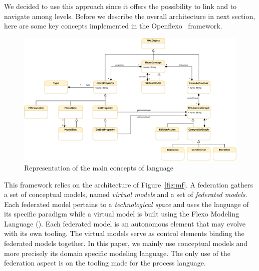 We decided to use this approach since it offers the possibility to
link and to navigate among levels. Before we describe the overall
architecture in next section, here are some key concepts implemented
in the Openflexo~\parencite{openflexo_link} framework.



\begin{figure}
    \centering
    \includegraphics[width=1.0 \textwidth]{Figures/FMLMetaModel.pdf}
    \caption{Representation of the main concepts of \FML language}
    \label{fig:mm}
\end{figure}

This framework relies on the architecture of Figure~\ref{fig:mf}. A federation
gathers a set of conceptual models, named \emph{virtual models} and a
set of \emph{federated models}. Each federated model pertains to a
\emph{technological space} and uses the language of its specific
paradigm while a virtual model is built using the Flexo Modeling
Language (\FML). Each federated model is an autonomous
element that may evolve with its own tooling. The virtual models
serve as control elements binding the federated models together.
In this paper, we mainly use conceptual models and more precisely \FML its domain specific modeling language. The only use of the federation aspect is on the tooling made for the process language.

